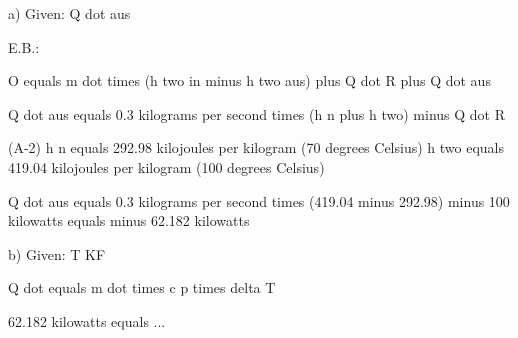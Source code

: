 a) Given: Q dot aus  

E.B.:  

O equals m dot times (h two in minus h two aus) plus Q dot R plus Q dot aus  

Q dot aus equals 0.3 kilograms per second times (h n plus h two) minus Q dot R  

(A-2)  
h n equals 292.98 kilojoules per kilogram (70 degrees Celsius)  
h two equals 419.04 kilojoules per kilogram (100 degrees Celsius)  

Q dot aus equals 0.3 kilograms per second times (419.04 minus 292.98) minus 100 kilowatts equals minus 62.182 kilowatts  

b) Given: T KF  

Q dot equals m dot times c p times delta T  

62.182 kilowatts equals ...